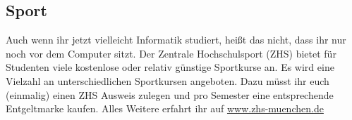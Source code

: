 \subsection{Sport}
Auch wenn ihr jetzt vielleicht Informatik studiert, heißt das nicht, dass 
ihr nur noch vor dem Computer sitzt. \doublebreak
Der Zentrale Hochschulsport (ZHS) bietet für Studenten 
viele kostenlose oder relativ günstige Sportkurse an.
 Es wird eine Vielzahl an unterschiedlichen Sportkursen angeboten.
Dazu müsst ihr euch (einmalig) einen ZHS Ausweis 
zulegen und pro Semester eine entsprechende 
Entgeltmarke kaufen. \doublebreak
Alles Weitere erfahrt ihr auf \url{www.zhs-muenchen.de}
